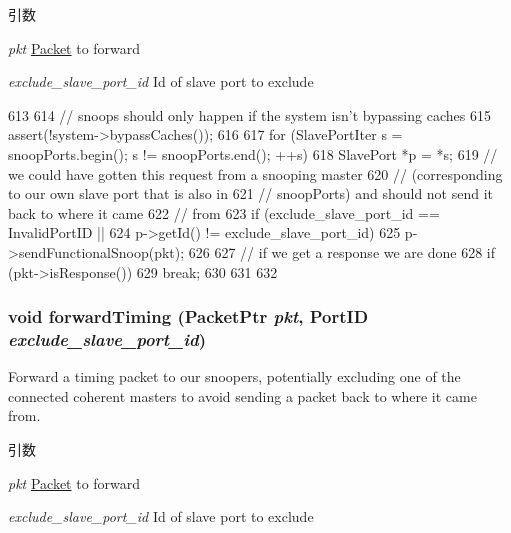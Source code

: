 \begin{DoxyParams}{引数}
\item[{\em pkt}]\hyperlink{classPacket}{Packet} to forward \item[{\em exclude\_\-slave\_\-port\_\-id}]Id of slave port to exclude \end{DoxyParams}



\begin{DoxyCode}
613 {
614     // snoops should only happen if the system isn't bypassing caches
615     assert(!system->bypassCaches());
616 
617     for (SlavePortIter s = snoopPorts.begin(); s != snoopPorts.end(); ++s) {
618         SlavePort *p = *s;
619         // we could have gotten this request from a snooping master
620         // (corresponding to our own slave port that is also in
621         // snoopPorts) and should not send it back to where it came
622         // from
623         if (exclude_slave_port_id == InvalidPortID ||
624             p->getId() != exclude_slave_port_id)
625             p->sendFunctionalSnoop(pkt);
626 
627         // if we get a response we are done
628         if (pkt->isResponse()) {
629             break;
630         }
631     }
632 }
\end{DoxyCode}
\hypertarget{classCoherentBus_a63303c7524b820a7d0de62c07b097139}{
\subsubsection[{forwardTiming}]{\setlength{\rightskip}{0pt plus 5cm}void forwardTiming ({\bf PacketPtr} {\em pkt}, \/  {\bf PortID} {\em exclude\_\-slave\_\-port\_\-id})}}
\label{classCoherentBus_a63303c7524b820a7d0de62c07b097139}
Forward a timing packet to our snoopers, potentially excluding one of the connected coherent masters to avoid sending a packet back to where it came from.


\begin{DoxyParams}{引数}
\item[{\em pkt}]\hyperlink{classPacket}{Packet} to forward \item[{\em exclude\_\-slave\_\-port\_\-id}]Id of slave port to exclude \end{DoxyParams}



